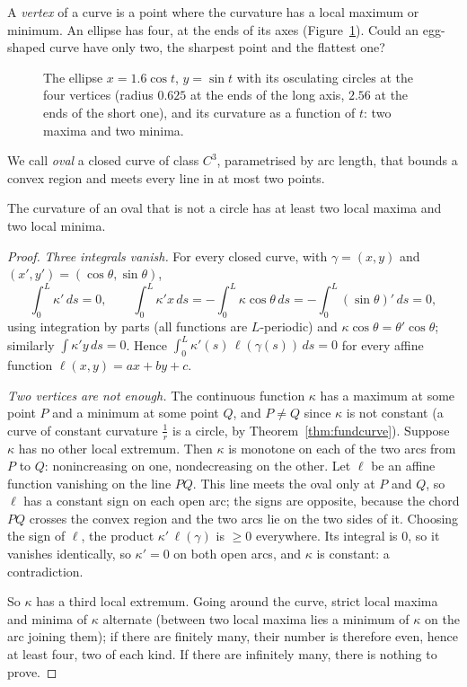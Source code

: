 A \emph{vertex} of a curve is a point where the curvature has a local maximum or minimum. An ellipse has four, at the ends of its axes
(Figure~\ref{fig:vertices}). Could an egg-shaped curve have only two, the sharpest point and the flattest one?

\begin{figure}[ht]
\centering
{}
\caption{The ellipse $x=1.6\cos t$, $y=\sin t$ with its osculating circles at the four vertices (radius $0.625$ at the ends of the long axis, $2.56$ at the ends of
the short one), and its curvature as a function of $t$: two maxima and two minima.}
\label{fig:vertices}
\end{figure}

We call \emph{oval} a closed curve of class $C^3$, parametrised by arc length, that bounds a convex region and meets every line in at most two points.

\begin{theorem}\label{thm:fourvertex}
The curvature of an oval that is not a circle has at least two local maxima and two local minima.
\end{theorem}

\begin{proof}
\emph{Three integrals vanish.} For every closed curve, with $\gamma=(x,y)$ and $(x',y')=(\cos\theta,\sin\theta)$,
\[
\int_0^L\kappa'\,ds=0,\qquad\int_0^L\kappa'x\,ds=-\int_0^L\kappa\cos\theta\,ds=-\int_0^L(\sin\theta)'\,ds=0,
\]
using integration by parts (all functions are $L$-periodic) and $\kappa\cos\theta=\theta'\cos\theta$; similarly $\int\kappa'y\,ds=0$. Hence
$\int_0^L\kappa'(s)\,\ell(\gamma(s))\,ds=0$ for every affine function $\ell(x,y)=ax+by+c$.

\emph{Two vertices are not enough.} The continuous function $\kappa$ has a maximum at some point $P$ and a minimum at some point $Q$, and $P\ne Q$ since $\kappa$ is
not constant (a curve of constant curvature $\frac1r$ is a circle, by Theorem~\ref{thm:fundcurve}). Suppose $\kappa$ has no other local extremum. Then $\kappa$ is
monotone on each of the two arcs from $P$ to $Q$: nonincreasing on one, nondecreasing on the other. Let $\ell$ be an affine function vanishing on the line $PQ$. This
line meets the oval only at $P$ and $Q$, so $\ell$ has a constant sign on each open arc; the signs are opposite, because the chord $PQ$ crosses the convex region
and the two arcs lie on the two sides of it. Choosing the sign of $\ell$, the product $\kappa'\,\ell(\gamma)$ is $\ge0$ everywhere. Its integral is $0$, so it vanishes
identically, so $\kappa'=0$ on both open arcs, and $\kappa$ is constant: a contradiction.

So $\kappa$ has a third local extremum. Going around the curve, strict local maxima and minima of $\kappa$ alternate (between two local maxima lies a minimum of $\kappa$ on
the arc joining them); if there are finitely many, their number is therefore even, hence at least four, two of each kind. If there are infinitely many, there is
nothing to prove.
\end{proof}

